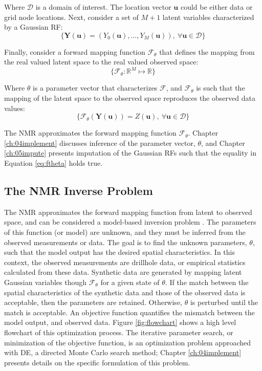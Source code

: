 Where $\mathcal{D}$ is a domain of interest. The location vector $\mathbf{u}$ could be either data or grid node locations. Next, consider a set of $M+1$ latent variables characterized by a Gaussian \gls{RF}:
\begin{equation}
    \{\mathbf{Y}(\mathbf{u}) = (Y_{0}(\mathbf{u}), \dots, Y_{M}(\mathbf{u})), \ \forall \mathbf{u} \in \mathcal{D}\}
    \label{eq:gpool}
\end{equation}

Finally, consider a forward mapping function $\mathcal{F}_{\theta}$ that defines the mapping from the real valued latent space to the real valued observed space:
\begin{equation}
    \{\mathcal{F}_{\theta}: \mathbb{R}^{M} \mapsto \mathbb{R} \}
    \label{eq:fmap}
\end{equation}

Where $\theta$ is a parameter vector that characterizes $\mathcal{F}$, and $\mathcal{F}_{\theta}$ is such that the mapping of the latent space to the observed space reproduces the observed data values:
\begin{equation}
    \{\mathcal{F}_{\theta}(\mathbf{Y}(\mathbf{u})) = Z(\mathbf{u}), \ \forall \mathbf{u} \in \mathcal{D}\}
    \label{eq:ftheta}
\end{equation}

The \gls{NMR} approximates the forward mapping function $\mathcal{F}_{\theta}$. Chapter \ref{ch:04implement} discusses inference of the parameter vector, $\theta$, and Chapter \ref{ch:05impute} presents imputation of the Gaussian \glspl{RF} such that the equality in Equation \ref{eq:ftheta} holds true.

\subsection{The NMR Inverse Problem}
\label{subsec:03nmrinverse}

The \gls{NMR} approximates the forward mapping function from latent to observed space, and can be considered a model-based inversion problem \citep{sen2013global}. The parameters of this function (or model) are unknown, and they must be inferred from the observed measurements or data. The goal is to find the unknown parameters, $\theta$, such that the model output has the desired spatial characteristics. In this context, the observed measurements are drillhole data, or empirical statistics calculated from these data. Synthetic data are generated by mapping latent Gaussian variables though $\mathcal{F}_{\theta}$ for a given state of $\theta$. If the match between the spatial characteristics of the synthetic data and those of the observed data is acceptable, then the parameters are retained. Otherwise, $\theta$ is perturbed until the match is acceptable. An objective function quantifies the mismatch between the model output, and observed data. Figure \ref{fig:flowchart} shows a high level flowchart of this optimization process. The iterative parameter search, or minimization of the objective function, is an optimization problem approached with \gls{DE}, a directed Monte Carlo search method; Chapter \ref{ch:04implement} presents details on the specific formulation of this problem.

